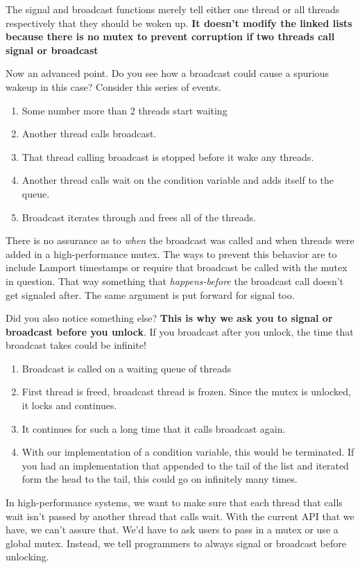 The signal and broadcast functions merely tell either one thread or all threads respectively that they should be woken up.
\textbf{It doesn't modify the linked lists because there is no mutex to prevent corruption if two threads call signal or broadcast}

Now an advanced point.
Do you see how a broadcast could cause a spurious wakeup in this case? Consider this series of events.

\begin{enumerate}
\item Some number more than 2 threads start waiting
\item Another thread calls broadcast.
\item That thread calling broadcast is stopped before it wake any threads.
\item Another thread calls wait on the condition variable and adds itself to the queue.
\item Broadcast iterates through and frees all of the threads.
\end{enumerate}

There is no assurance as to \textit{when} the broadcast was called and when threads were added in a high-performance mutex.
The ways to prevent this behavior are to include Lamport timestamps or require that broadcast be called with the mutex in question.
That way something that \textit{happens-before} the broadcast call doesn't get signaled after.
The same argument is put forward for signal too.

Did you also notice something else?
\textbf{This is why we ask you to signal or broadcast before you unlock}.
If you broadcast after you unlock, the time that broadcast takes could be infinite!
\begin{enumerate}
\item Broadcast is called on a waiting queue of threads
\item First thread is freed, broadcast thread is frozen. Since the mutex is unlocked, it locks and continues.
\item It continues for such a long time that it calls broadcast again.
\item With our implementation of a condition variable, this would be terminated.
  If you had an implementation that appended to the tail of the list and iterated form the head to the tail, this could go on infinitely many times.
\end{enumerate}

In high-performance systems, we want to make sure that each thread that calls wait isn't passed by another thread that calls wait.
With the current API that we have, we can't assure that.
We'd have to ask users to pass in a mutex or use a global mutex.
Instead, we tell programmers to always signal or broadcast before unlocking.


